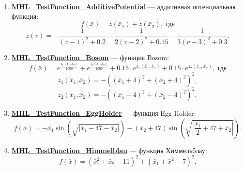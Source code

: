 \begin{enumerate}
\begin{equation}
\begin{aligned}
 \end{aligned}\right.
 \end{equation}
 \item \hyperref[TestFunctions:section:MHL_TestFunction_AdditivePotential]{\textbf{MHL\_TestFunction\_AdditivePotential}} --- аддитивная потенциальная функция:
 \begin{equation}
 f\left( \bar{x}\right) = z\left( \bar{x}_1\right)+ z\left( \bar{x}_2\right), \text{ где}
 \end{equation}
 \begin{equation*}
 z\left( v\right)= -\dfrac{1}{\left( v-1\right)^2+0.2 }-\dfrac{1}{2\left( v-2\right)^2+0.15}-\dfrac{1}{3\left( v-3\right)^2+0.3}.
 \end{equation*}
\item \hyperref[TestFunctions:section:MHL_TestFunction_Bosom]{\textbf{MHL\_TestFunction\_Bosom}} --- функция Bosom:
\begin{equation}
f\left( \bar{x}\right) = e^{\frac{z_1\left( \bar{x}_1,\bar{x}_2\right)}{1000} } +e^{\frac{z_2\left( \bar{x}_1,\bar{x}_2\right)}{1000} }+ 0.15\cdot e^{z_1\left( \bar{x}_1,\bar{x}_2\right) }+0.15\cdot e^{z_2\left( \bar{x}_1,\bar{x}_2\right) }, \text{ где}
\end{equation}
\begin{equation*}
\label{TestFunctions:eq:MHL_Bosom2}
z_1\left( \bar{x}_1,\bar{x}_2\right) = -\left(\left( \bar{x}_1+4\right)^2 +\left( \bar{x}_2+4\right)^2 \right)^2 ,
\end{equation*}
\begin{equation*}
\label{TestFunctions:eq:MHL_Bosom3}
z_2\left( \bar{x}_1,\bar{x}_2\right) = -\left(\left( \bar{x}_1-4\right)^2 +\left( \bar{x}_2-4\right)^2 \right)^2 ,
\end{equation*}
 \item \hyperref[TestFunctions:section:MHL_TestFunction_EggHolder]{\textbf{MHL\_TestFunction\_EggHolder}} --- функция Egg Holder:
 \begin{equation}
 f\left( \bar{x}\right) = -\bar{x}_1\sin\left( \sqrt{\left| \bar{x}_1-47-\bar{x}_2\right| }\right)- (\bar{x}_2+47)\sin\left( \sqrt{\left| \dfrac{\bar{x}_1}{2}+47+\bar{x}_2\right| }\right).
 \end{equation}
 \item \hyperref[TestFunctions:section:MHL_TestFunction_Himmelblau]{\textbf{MHL\_TestFunction\_Himmelblau}} --- функция Химмельблау:
 \begin{equation}
 f\left( \bar{x}\right) = \left( \bar{x}_1^2+\bar{x}_2-11\right)^2+\left( \bar{x}_1+\bar{x}^2-7\right)^2.

\end{equation}
\end{enumerate}
